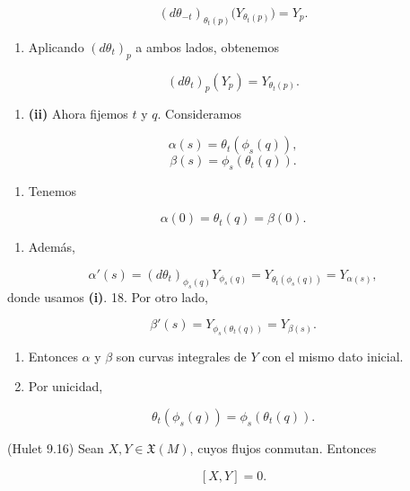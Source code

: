 \begin{bookproof}{}
\[
(d\theta_{-t})_{\theta_t(p)}\big(Y_{\theta_t(p)}\big)=Y_p.
\]
\begin{enumerate}[start=14]
\item Aplicando $(d\theta_t)_p$ a ambos lados, obtenemos
\end{enumerate}
\[
(d\theta_t)_p(Y_p)=Y_{\theta_t(p)}.
\]
\begin{enumerate}[start=15]
\item \textbf{(ii)} Ahora fijemos $t$ y $q$. Consideramos
\end{enumerate}
\[
\alpha(s)=\theta_t(\phi_s(q)),
\]
\[
\beta(s)=\phi_s(\theta_t(q)).
\]
\begin{enumerate}[start=16]
\item Tenemos
\end{enumerate}
\[
\alpha(0)=\theta_t(q)=\beta(0).
\]
\begin{enumerate}[start=17]
\item Además,
\end{enumerate}
\[
\alpha'(s)=(d\theta_t)_{\phi_s(q)}Y_{\phi_s(q)}=Y_{\theta_t(\phi_s(q))}=Y_{\alpha(s)},
\]
donde usamos \textbf{(i)}. 18. Por otro lado,

\[
\beta'(s)=Y_{\phi_s(\theta_t(q))}=Y_{\beta(s)}.
\]
\begin{enumerate}[start=19]
\item Entonces $\alpha$ y $\beta$ son curvas integrales de $Y$ con el mismo dato inicial.
\item Por unicidad,
\end{enumerate}
\[
\theta_t(\phi_s(q))=\phi_s(\theta_t(q)).
\]
\bookqed
\end{bookproof}
\label{blk:26db5d}
\begin{bookproposition}{(Hulet 9.16)}
Sean $X,Y\in\mathfrak{X}(M)$, cuyos flujos conmutan. Entonces

\[
[X,Y]=0.
\]
\end{bookproposition}
